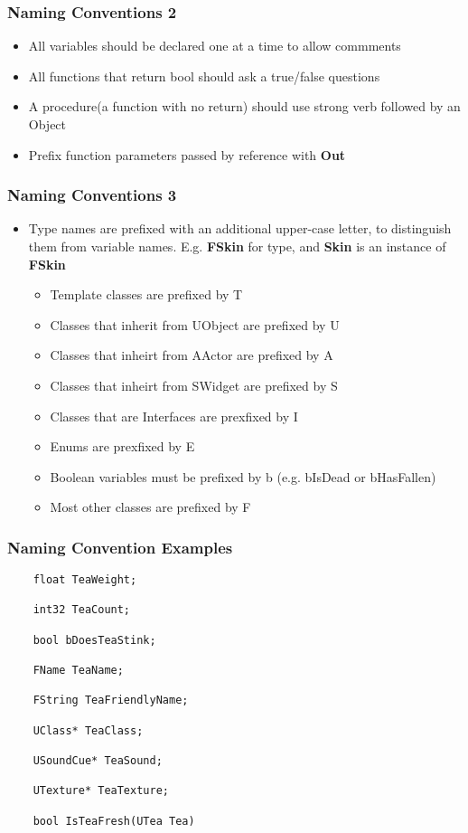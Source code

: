 \begin{frame}
  \frametitle{Naming Conventions 2}
  \begin{itemize}
    \item All variables should be declared one at a time to allow commments
    \item All functions that return bool should ask a true/false questions
    \item A procedure(a function with no return) should use strong verb followed by an Object
    \item Prefix function parameters passed by reference with \textbf{Out}
  \end{itemize}
\end{frame}

\begin{frame}
  \frametitle{Naming Conventions 3}
  \begin{itemize}
    \item Type names are prefixed with an additional upper-case letter, to distinguish them from variable names.
    E.g. \textbf{FSkin} for type, and \textbf{Skin} is an instance of \textbf{FSkin}
    \begin{itemize}
      \item Template classes are prefixed by T
      \item Classes that inherit from UObject are prefixed by U
      \item Classes that inheirt from AActor are prefixed by A
      \item Classes that inheirt from SWidget are prefixed by S
      \item Classes that are Interfaces are prexfixed by I
      \item Enums are prexfixed by E
      \item Boolean variables must be prefixed by b (e.g. bIsDead or bHasFallen)
      \item Most other classes are prefixed by F
    \end{itemize}
  \end{itemize}
\end{frame}

\begin{frame}[fragile]
  \frametitle{Naming Convention Examples}
  \begin{lstlisting}
    float TeaWeight;

    int32 TeaCount;

    bool bDoesTeaStink;

    FName TeaName;

    FString TeaFriendlyName;

    UClass* TeaClass;

    USoundCue* TeaSound;

    UTexture* TeaTexture;

    bool IsTeaFresh(UTea Tea)
  \end{lstlisting}
\end{frame}

